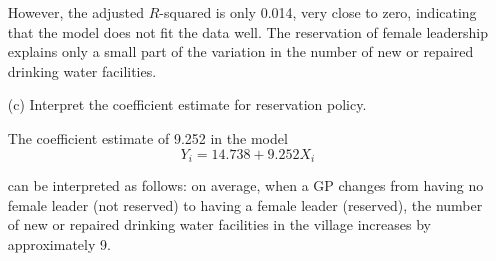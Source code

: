 \documentclass[12pt,letterpaper]{article}
\begin{document}
\begin{enumerate}
		However, the adjusted \(R\)-squared is only 0.014, very close to zero, indicating that the model does not fit the data well. The reservation of female leadership explains only a small part of the variation in the number of new or repaired drinking water facilities.
		
		\item [(c)] Interpret the coefficient estimate for reservation policy.
		
		The coefficient estimate of 9.252 in the model
		\[
		Y_i = 14.738 + 9.252 X_i
		\]
		
		can be interpreted as follows: on average, when a GP changes from having no female leader (not reserved) to having a female leader (reserved), the number of new or repaired drinking water facilities in the village increases by approximately 9.
		
	\end{enumerate}
	
\end{document}
